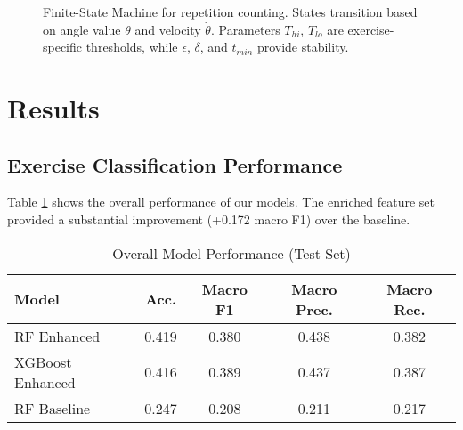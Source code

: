 \documentclass[conference]{IEEEtran}
\begin{document}
\begin{figure}[ht]
\centering
{}
\caption{Finite-State Machine for repetition counting. States transition based on angle value $\theta$ and velocity $\dot{\theta}$. Parameters $T_{hi}$, $T_{lo}$ are exercise-specific thresholds, while $\epsilon$, $\delta$, and $t_{min}$ provide stability.}
\label{fig:fsm}
\end{figure}

\section{Results}

\subsection{Exercise Classification Performance}
Table \ref{tab:overall_results} shows the overall performance of our models. The enriched feature set provided a substantial improvement (+0.172 macro F1) over the baseline.

\begin{table}[ht]
\caption{Overall Model Performance (Test Set)}
\label{tab:overall_results}
\centering
\begin{tabular}{lcccc}
\toprule
\textbf{Model} & \textbf{Acc.} & \textbf{Macro F1} & \textbf{Macro Prec.} & \textbf{Macro Rec.} \\
\midrule
RF Enhanced & 0.419 & 0.380 & 0.438 & 0.382 \\
XGBoost Enhanced & 0.416 & 0.389 & 0.437 & 0.387 \\
RF Baseline & 0.247 & 0.208 & 0.211 & 0.217 \\
\bottomrule
\end{tabular}
\end{table}
\end{document}
